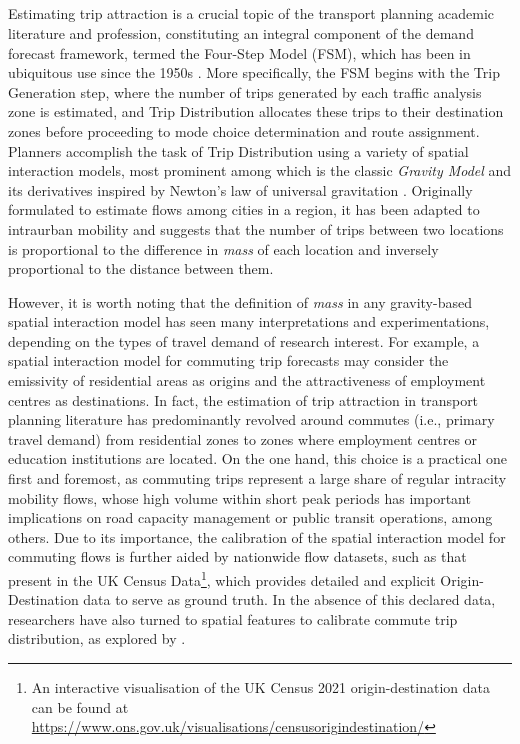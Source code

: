 
\subsection*{}

Estimating trip attraction is a crucial topic of the transport planning academic literature and profession, constituting an integral component of the demand forecast framework, termed the Four-Step Model (FSM), which has been in ubiquitous use since the 1950s \citep{TravelForecastingResource}. More specifically, the FSM begins with the Trip Generation step, where the number of trips generated by each traffic analysis zone is estimated, and Trip Distribution allocates these trips to their destination zones before proceeding to mode choice determination and route assignment. Planners accomplish the task of Trip Distribution using a variety of spatial interaction models, most prominent among which is the classic \textit{Gravity Model} and its derivatives inspired by Newton's law of universal gravitation \citep{erlanderGravityModelTransportation1990}. Originally formulated to estimate flows among cities in a region, it has been adapted to intraurban mobility and suggests that the number of trips between two locations is proportional to the difference in \textit{mass} of each location and inversely proportional to the distance between them. 

However, it is worth noting that the definition of \textit{mass} in any gravity-based spatial interaction model has seen many interpretations and experimentations, depending on the types of travel demand of research interest. For example, a spatial interaction model for commuting trip forecasts may consider the emissivity of residential areas as origins and the attractiveness of employment centres as destinations. In fact, the estimation of trip attraction in transport planning literature has predominantly revolved around commutes (i.e., primary travel demand) from residential zones to zones where employment centres or education institutions are located. On the one hand, this choice is a practical one first and foremost, as commuting trips represent a large share of regular intracity mobility flows, whose high volume within short peak periods has important implications on road capacity management or public transit operations, among others. Due to its importance, the calibration of the spatial interaction model for commuting flows is further aided by nationwide flow datasets, such as that present in the UK Census Data\footnote{An interactive visualisation of the UK Census 2021 origin-destination data can be found at \url{https://www.ons.gov.uk/visualisations/censusorigindestination/}}, which provides detailed and explicit Origin-Destination data to serve as ground truth. In the absence of this declared data, researchers have also turned to spatial features to calibrate commute trip distribution, as explored by \cite{yangLimitsPredictabilityCommuting2014}.

